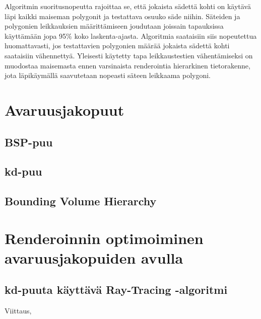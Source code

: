 \documentclass[a4paper,12pt, titlepage]{article}
\theoremstyle{break}
\begin{document}
Algoritmin suoritusnopeutta rajoittaa se, että jokaista sädettä kohti on käytävä läpi kaikki maiseman polygonit ja testattava osuuko säde niihin. Säteiden ja polygonien leikkauksien määrittämiseen joudutaan joissain tapauksissa käyttämään jopa 95\% koko laskenta-ajasta.\cite{whitted} Algoritmia saataisiin siis nopeutettua huomattavasti, jos testattavien polygonien määrää jokaista sädettä kohti saataisiin vähennettyä. Yleisesti käytetty tapa leikkaustestien vähentämiseksi on muodostaa maisemasta ennen varsinaista renderointia hierarkinen tietorakenne, jota läpikäymällä saavutetaan nopeasti säteen leikkaama polygoni.\cite{rubin}

\section{Avaruusjakopuut}
\subsection{BSP-puu}
\subsection{kd-puu}
\subsection{Bounding Volume Hierarchy}

\section{Renderoinnin optimoiminen avaruusjakopuiden avulla}
\subsection{kd-puuta käyttävä Ray-Tracing -algoritmi}
Viittaus\cite{ranta},\cite{samet}\cite{havran}

\newpage

\listofalgorithms
\end{document}
